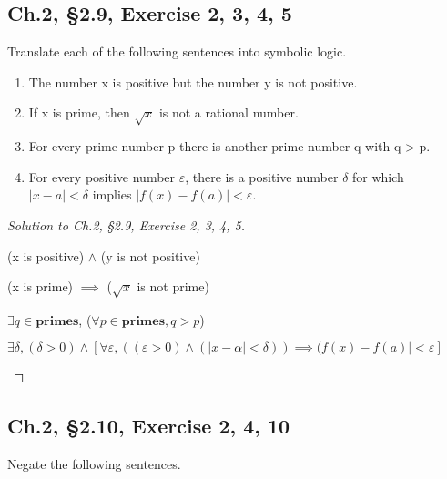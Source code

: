 \documentclass[12pt]{amsart}
\numberwithin{equation}{section}
\theoremstyle{definition}
\theoremstyle{remark}
\begin{document}
\subsection*{Ch.2, \S 2.9,  Exercise 2, 3, 4, 5}
Translate each of the following sentences into symbolic logic.

\begin{enumerate}

\item[2.]
The number x is positive but the number y is not positive.

\item[3.]
If x is prime, then $ \sqrt{x} $ is not a rational number.

\item[4.]
For every prime number p there is another prime number q with q > p.

\item[5.]
For every positive number $ \varepsilon $, there is a positive number $ \delta $ for which $ |x - a| < \delta $ implies $ |f(x)-f(a)| < \varepsilon $.

\end{enumerate}


\begin{proof}[Solution to Ch.2, \S 2.9,  Exercise 2, 3, 4, 5] \ \\

\begin{center}

\item[2.]
(x is positive) $ \land $ (y is not positive)

\item[3.]
(x is prime) $ \implies $ ($ \sqrt{x} $ is not prime)

\item[4.]
$ \exists q \in \textbf{primes} $, ($ \forall p \in \textbf{primes}, q > p $)

\item[5.]
$ \exists \delta, (\delta > 0) \land [\forall \varepsilon, ((\varepsilon > 0) \land (|x-\alpha| < \delta)) \implies (f(x)-f(a)| < \varepsilon] $

\end{center}

\end{proof}




\subsection*{Ch.2, \S 2.10,  Exercise 2, 4, 10}
Negate the following sentences.
\end{document}

